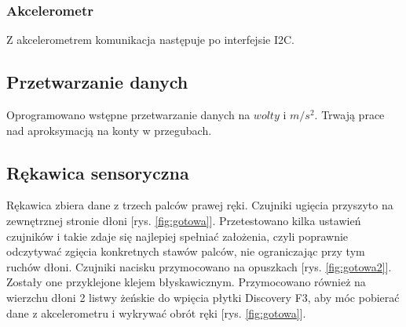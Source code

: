 \documentclass[12pt,a4paper]{article}
\begin{document}
\subsubsection{Akcelerometr}
Z akcelerometrem komunikacja następuje po interfejsie I2C.

\subsection{Przetwarzanie danych}
Oprogramowano wstępne przetwarzanie danych na $wolty$ i $m/s^2$. Trwają prace nad aproksymacją na konty w przegubach.

\subsection{Rękawica sensoryczna}
Rękawica zbiera dane z trzech palców prawej ręki. Czujniki ugięcia przyszyto na zewnętrznej stronie dłoni [rys. \ref{fig:gotowa}].
 Przetestowano kilka ustawień czujników i takie zdaje się najlepiej spełniać założenia, czyli poprawnie odczytywać zgięcia konkretnych stawów palców, nie ograniczając przy tym ruchów dłoni. Czujniki nacisku przymocowano na opuszkach [rys. \ref{fig:gotowa2}]. Zostały one przyklejone klejem błyskawicznym. Przymocowano również na wierzchu dłoni 2 listwy żeńskie do wpięcia płytki Discovery F3, aby móc pobierać dane z akcelerometru i wykrywać obrót ręki [rys. \ref{fig:gotowa}].
 
\end{document}
